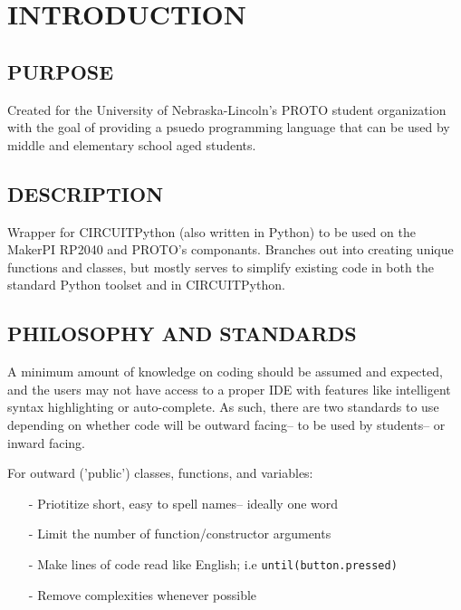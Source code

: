 \documentclass[12pt]{scrartcl} %
\begin{document}
\tableofcontents

\newpage

\section{INTRODUCTION}

\subsection{PURPOSE}

Created for the University of Nebraska-Lincoln's PROTO student organization
with the goal of providing a psuedo programming language that can be used by
middle and elementary school aged students.

\subsection{DESCRIPTION}

Wrapper for CIRCUITPython (also written in Python) to be used on the MakerPI
RP2040 and PROTO's componants. Branches out into creating unique functions and
classes, but mostly serves to simplify existing code in both the standard
Python toolset and in CIRCUITPython.

\subsection{PHILOSOPHY AND STANDARDS}

A minimum amount of knowledge on coding should be assumed and expected, and the
users may not have access to a proper IDE with features like intelligent syntax
highlighting or auto-complete. As such, there are two standards to use
depending on whether code will be outward facing-- to be used by students-- or
inward facing.

For outward ('public') classes, functions, and variables:

\begin{itemize}
  \item[-] Priotitize short, easy to spell names-- ideally one word
  \item[-] Limit the number of function/constructor arguments
  \item[-] Make lines of code read like English; i.e
    \texttt{until(button.pressed)}
  \item[-] Remove complexities whenever possible
\end{itemize}
\end{document}
